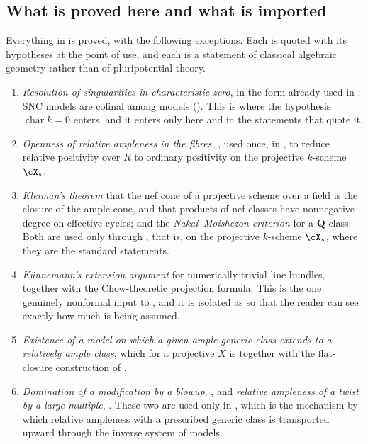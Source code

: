 \subsection{What is proved here and what is imported}
\label{sec:ch20-imported}

Everything in  is
proved, with the following exceptions.  Each is quoted with its hypotheses
at the point of use, and each is a statement of classical algebraic
geometry rather than of pluripotential theory.

\begin{enumerate}
\item\label{itm:ch20-import:res}
 \emph{Resolution of singularities in characteristic zero}, in the form
 already used in : SNC models are cofinal among models
 ().  This is where the hypothesis
 $\operatorname{char}k=0$ enters, and it enters only here and in the
 statements that quote it.
\item\label{itm:ch20-import:ega}
 \emph{Openness of relative ampleness in the fibres},
 \cite[4.7.1]{EGAIII1}, used once, in
 , to reduce relative positivity over
 $R$ to ordinary positivity on the projective $k$-scheme $\cX_s$.
\item\label{itm:ch20-import:kleiman}
 \emph{Kleiman's theorem} that the nef cone of a projective scheme over a
 field is the closure of the ample cone, and that products of nef classes
 have nonnegative degree on effective cycles; and the
 \emph{Nakai--Moishezon criterion} for a $\mathbf Q$-class.  Both are used
 only through , that is, on the projective
 $k$-scheme $\cX_s$, where they are the standard statements.
\item\label{itm:ch20-import:kunnemann}
 \emph{K\"unnemann's extension argument} for numerically trivial line
 bundles, together with the Chow-theoretic projection formula.  This is the
 one genuinely nonformal input to , and it is
 isolated as  so that the reader can see
 exactly how much is being assumed.
\item\label{itm:ch20-import:extension}
 \emph{Existence of a model on which a given ample generic class extends to
 a relatively ample class}, which for a projective $X$ is
  together with the flat-closure
 construction of .
\item\label{itm:ch20-import:blowup}
 \emph{Domination of a modification by a blowup},
 , and \emph{relative ampleness of a
 twist by a large multiple}, \cite[4.6.13]{EGAII}.  These two are used only
 in , which is the mechanism by which
 relative ampleness with a prescribed generic class is transported upward
 through the inverse system of models.
\end{enumerate}

